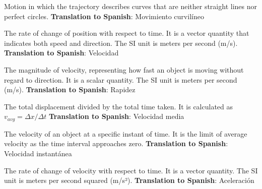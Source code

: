 \begin{vocabulary}
Motion in which the trajectory describes curves that are neither straight lines nor perfect circles. \newline
\textbf{Translation to Spanish}: Movimiento curvilíneo \newline
\end{vocabulary}

\begin{vocabulary}[Velocity]
The rate of change of position with respect to time. It is a vector quantity that indicates both speed and direction. The SI unit is meters per second (m/s). \newline
\textbf{Translation to Spanish}: Velocidad \newline
\end{vocabulary}

\begin{vocabulary}[Speed]
The magnitude of velocity, representing how fast an object is moving without regard to direction. It is a scalar quantity. The SI unit is meters per second (m/s). \newline
\textbf{Translation to Spanish}: Rapidez \newline
\end{vocabulary}

\begin{vocabulary}
The total displacement divided by the total time taken. It is calculated as \( v_{avg} = \Delta x / \Delta t \) \newline
\textbf{Translation to Spanish}: Velocidad media \newline
\end{vocabulary}

\begin{vocabulary}
The velocity of an object at a specific instant of time. It is the limit of average velocity as the time interval approaches zero. \newline
\textbf{Translation to Spanish}: Velocidad instantánea \newline
\end{vocabulary}

\begin{vocabulary}[Acceleration]
The rate of change of velocity with respect to time. It is a vector quantity. The SI unit is meters per second squared (m/s²). \newline
\textbf{Translation to Spanish}: Aceleración \newline
\end{vocabulary}

